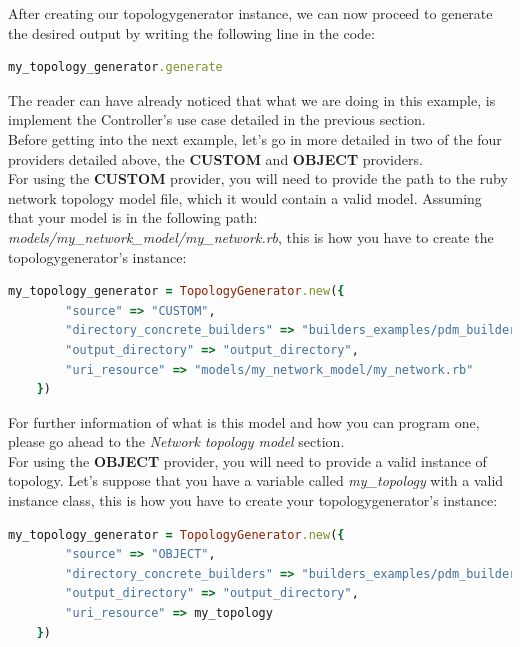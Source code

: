 After creating our topologygenerator instance, we can now proceed to generate the desired output by writing the following line in the code:

\begin{lstlisting}[language=Ruby,breaklines=true]
my_topology_generator.generate
\end{lstlisting}
 
The reader can have already noticed that what we are doing in this example, is implement the Controller's use case detailed in the previous section.\\

Before getting into the next example, let's go in more detailed in two of the four providers detailed above, the \textbf{CUSTOM} and \textbf{OBJECT} providers.\\
For using the \textbf{CUSTOM} provider, you will need to provide the path to the ruby network topology model file, which it would contain a valid model. Assuming that your model is in the following path: \textit{models/my\_network\_model/my\_network.rb}, this is how you have to create the topologygenerator's instance:

\begin{lstlisting}[language=Ruby,breaklines=true]
my_topology_generator = TopologyGenerator.new({
        "source" => "CUSTOM",
        "directory_concrete_builders" => "builders_examples/pdm_builders",
        "output_directory" => "output_directory",
        "uri_resource" => "models/my_network_model/my_network.rb"
    })
\end{lstlisting}

For further information of what is this model and how you can program one, please go ahead to the \textit{Network topology model} section.\\

For using the \textbf{OBJECT} provider, you will need to provide a valid instance of topology. Let's suppose that you have a variable called \textit{my\_topology} with a valid instance class, this is how you have to create your topologygenerator's instance:

\begin{lstlisting}[language=Ruby,breaklines=true]
my_topology_generator = TopologyGenerator.new({
        "source" => "OBJECT",
        "directory_concrete_builders" => "builders_examples/pdm_builders",
        "output_directory" => "output_directory",
        "uri_resource" => my_topology
    })
\end{lstlisting}

